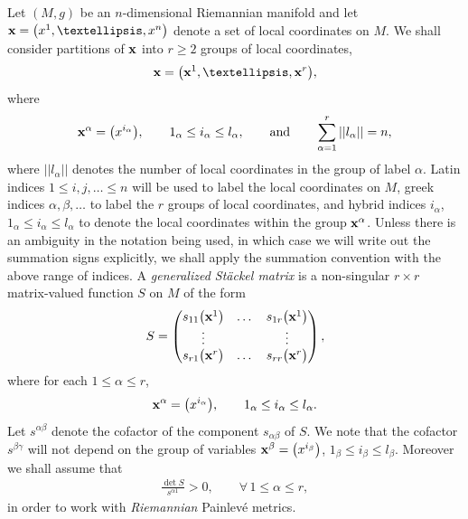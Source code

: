 \documentclass[11pt]{article}
\numberwithin{equation}{section}
\begin{document}
Let $(M,g)$ be an $n$-dimensional Riemannian manifold and let ${\bf x}=\big(x^{1},\dots , x^{n}\big)$ denote a set of local coordinates on $M$. We shall consider partitions of ${\bf x}$ into $r\geq 2$ groups of local coordinates,
\[
{\bf x}=\big({{\bf x}^{1}},\dots,{{\bf x}^{r}}\big),
\]
where
\[
{\bf {x}}^{\alpha}=\big(x^{i_{\alpha}}\big),\qquad 1_{\alpha}\leq i_{\alpha} \leq l_{\alpha},\qquad \text{and}\qquad \sum_{\alpha=1}^{r}||l_{\alpha}||=n,
\]
where $||l_{\alpha}||$ denotes the number of local coordinates in the group of label $\alpha$. Latin indices $1\leq i,j,\ldots \leq n$ will be used to label the local coordinates on $M$, greek indices $\alpha,\beta,\dots$ to label the $r$ groups of local coordinates, and hybrid indices $i_{\alpha}$, $1_{\alpha} \leq i_{\alpha}\leq l_{\alpha}$ to denote the local coordinates within the group $\bf{x^{\alpha}}$. Unless there is an ambiguity in the notation being used, in which case we will write out the summation signs explicitly, we shall apply the summation convention with the above range of indices.
A {\em generalized St\"ackel matrix} is a non-singular $r\times r$ matrix-valued function $S$ on $M$ of the form
\begin{gather}\label{genStackelmat}
S=\left(
\begin{matrix}
s_{11}\big({{\bf x}^{1}}\big)&\dots&s_{1r}\big({{\bf x}^{1}}\big) \\
\vdots& & \vdots \\
s_{r1}\big({{\bf x}^{r}}\big)&\dots&s_{rr}\big({\bf x}^{r}\big)
\end{matrix}
\right),
\end{gather}
where for each $1\leq \alpha \leq r$,
\[
{\bf x}^{\alpha}=\big(x^{i_{\alpha}}\big),\qquad 1_{\alpha}\leq i_{\alpha} \leq l_{\alpha}.
\]
Let $s^{\alpha \beta}$ denote the cofactor of the component $s_{\alpha \beta}$ of $S$. We note that the cofactor $s^{\beta \gamma}$ will not depend on the group of variables ${\bf x}^{\beta}=\big(x^{i_{\beta}}\big)$, $1_{\beta}\leq i_{\beta} \leq l_{\beta}$. Moreover we shall assume that
\begin{gather} \label{StackelPositiveness}
\frac{\det S}{s^{\alpha 1}} > 0, \qquad \forall\, 1\leq \alpha \leq r ,
\end{gather}
in order to work with {\emph{Riemannian}} Painlev\'e metrics.
\end{document}
